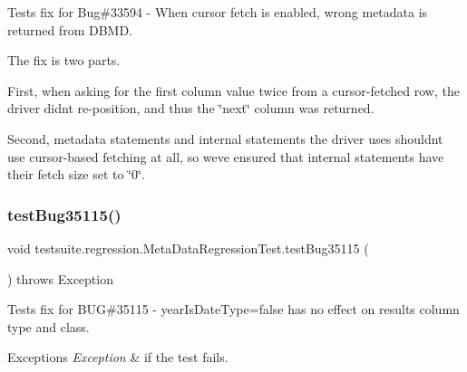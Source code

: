 Tests fix for Bug\#33594 -\/ When cursor fetch is enabled, wrong metadata is returned from D\+B\+MD.

The fix is two parts.

First, when asking for the first column value twice from a cursor-\/fetched row, the driver didn\textquotesingle{}t re-\/position, and thus the \char`\"{}next\char`\"{} column was returned.

Second, metadata statements and internal statements the driver uses shouldn\textquotesingle{}t use cursor-\/based fetching at all, so we\textquotesingle{}ve ensured that internal statements have their fetch size set to \char`\"{}0\char`\"{}. \mbox{\label{classtestsuite_1_1regression_1_1_meta_data_regression_test_a73c2bf687084e2bc8c33f56cce84bdbf}} 
\subsubsection{\texorpdfstring{test\+Bug35115()}{testBug35115()}}
{\footnotesize\ttfamily void testsuite.\+regression.\+Meta\+Data\+Regression\+Test.\+test\+Bug35115 (\begin{DoxyParamCaption}{ }\end{DoxyParamCaption}) throws Exception}

Tests fix for B\+UG\#35115 -\/ year\+Is\+Date\+Type=false has no effect on result\textquotesingle{}s column type and class.


\begin{DoxyExceptions}{Exceptions}
{\em Exception} & if the test fails. \\
\hline
\end{DoxyExceptions}
\mbox{\label{classtestsuite_1_1regression_1_1_meta_data_regression_test_a6b6d260139fb71288f93be76dac3f047}} 
